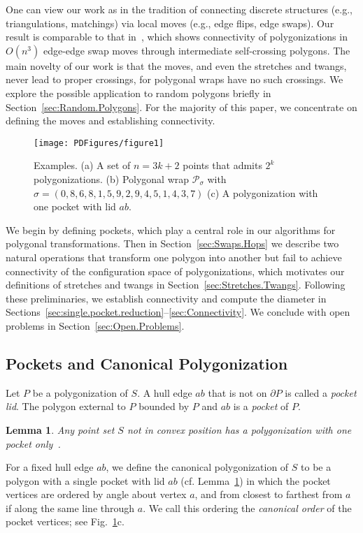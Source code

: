 \pdfoutput=1  \documentclass{article}
\newcommand\Pw{\mathcal{P}}
\newtheorem{lemma}[theorem]{Lemma}
\newcommand{\lemlab}[1]{\label{lemma:#1}}
\newcommand{\figlab}[1]{\label{fig:#1}}
\newcommand{\seclab}[1]{\label{sec:#1}}
\newcommand{\lemref}[1]{\ref{lemma:#1}}
\newcommand{\secref}[1]{\ref{sec:#1}}
\newcommand{\figref}[1]{\ref{fig:#1}}
\begin{document}
One can view our work as in the
tradition of connecting discrete structures (e.g., triangulations,
matchings) via local moves (e.g., edge flips, edge swaps).  Our result
is comparable to that in~\cite{ls-utstp-82}, which shows connectivity
of polygonizations in $O(n^3)$ edge-edge swap moves through
intermediate self-crossing polygons. The main novelty of our work is
that the moves, and even the stretches and twangs, never lead to
proper crossings, for polygonal wraps have no such crossings. We explore
the possible application to random polygons briefly in
Section~\secref{Random.Polygons}. For the majority of this paper, we
concentrate on defining the moves and establishing connectivity.

\begin{figure}[htbp]
\centering
\texttt{[image: PDFigures/figure1]}
\vspace{-0.5em}\caption{Examples. (a) A set of $n=3k+2$ points that
admits $2^k$ polygonizations. (b) Polygonal wrap $\Pw_\sigma$ with
$\sigma=(0,8,6,8,1,5,9,2,9,4,5,1,4,3,7)$ (c) A polygonization with
one pocket with lid $ab$.} \figlab{one.pocket.polygonization}
\end{figure}


We begin by defining pockets, which play a central role in our
algorithms for polygonal transformations. Then in
Section~\secref{Swaps.Hops} we describe two natural operations that
transform one polygon into another but fail to achieve connectivity of
the configuration space of polygonizations, which motivates our
definitions of stretches and twangs in
Section~\secref{Stretches.Twangs}. Following these preliminaries, we
establish connectivity and compute the diameter in
Sections~\secref{single.pocket.reduction}--\secref{Connectivity}.
We conclude with open problems in Section~\secref{Open.Problems}.

\subsection{Pockets and Canonical Polygonization}
\seclab{Pockets} Let $P$ be a polygonization of $S$. A hull edge
$ab$ that is not on $\partial P$ is called a \emph{pocket lid}. The
polygon external to $P$ bounded by $P$ and $ab$ is a \emph{pocket}
of $P$.


\begin{lemma}
Any point set $S$ not in convex position has a polygonization with
one pocket only~\emph{\cite{chuz-peps-92}}. \lemlab{one.pocket}
\end{lemma}
For a fixed hull edge $ab$, we define the canonical polygonization
of $S$ to be a polygon with a single pocket with lid $ab$ (cf.
Lemma~\lemref{one.pocket}) in which the pocket vertices are ordered
by angle about vertex $a$, and from closest to farthest from $a$ if
along the same line through $a$. We call this ordering the
\emph{canonical order} of the pocket vertices; see
Fig.~\figref{one.pocket.polygonization}c.
\end{document}
